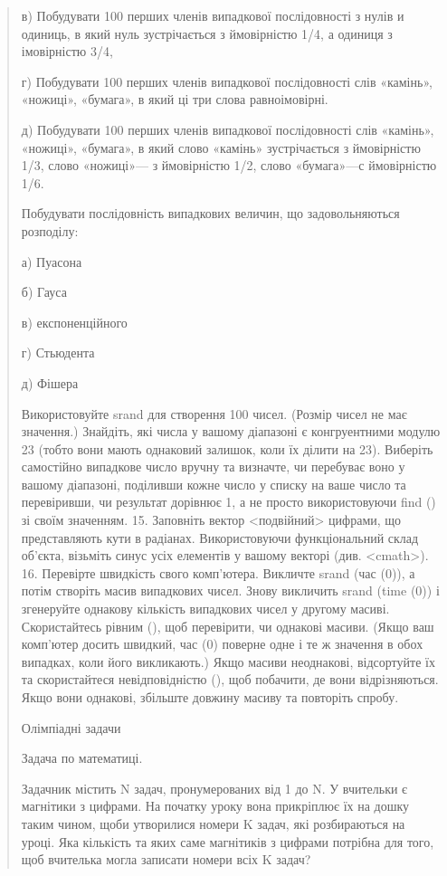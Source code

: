 \documentclass[]{article}
\begin{document}
\begin{quote}
в) Побудувати 100 перших членів випадкової послідовності з нулів и
одиниць, в який нуль зустрічається з ймовірністю 1/4, а одиниця з
імовірністю 3/4,

г) Побудувати 100 перших членів випадкової послідовності слів «камінь»,
«ножиці», «бумага», в який ці три слова равноімовірні.

д) Побудувати 100 перших членів випадкової послідовності слів «камінь»,
«ножиці», «бумага», в який слово «камінь» зустрічається з ймовірністю
1/3, слово «ножиці»--- з ймовірністю 1/2, слово «бумага»---с ймовірністю
1/6.

Побудувати послідовність випадкових величин, що задовольняються
розподілу:

а) Пуасона

б) Гауса

в) експоненційного

г) Стьюдента

д) Фішера

Використовуйте srand для створення 100 чисел. (Розмір чисел не має
значення.) Знайдіть, які числа у вашому діапазоні є конгруентними модулю
23 (тобто вони мають однаковий залишок, коли їх ділити на 23). Виберіть
самостійно випадкове число вручну та визначте, чи перебуває воно у
вашому діапазоні, поділивши кожне число у списку на ваше число та
перевіривши, чи результат дорівнює 1, а не просто використовуючи find ()
зі своїм значенням. 15. Заповніть вектор
\textless{}подвійний\textgreater{} цифрами, що представляють кути в
радіанах. Використовуючи функціональний склад об'єкта, візьміть синус
усіх елементів у вашому векторі (див. \textless{}cmath\textgreater{}).
16. Перевірте швидкість свого комп'ютера. Викличте srand (час (0)), а
потім створіть масив випадкових чисел. Знову викличить srand (time (0))
і згенеруйте однакову кількість випадкових чисел у другому масиві.
Скористайтесь рівним (), щоб перевірити, чи однакові масиви. (Якщо ваш
комп'ютер досить швидкий, час (0) поверне одне і те ж значення в обох
випадках, коли його викликають.) Якщо масиви неоднакові, відсортуйте їх
та скористайтеся невідповідністю (), щоб побачити, де вони
відрізняються. Якщо вони однакові, збільште довжину масиву та повторіть
спробу.

Олімпіадні задачи

Задача по математиці.

Задачник містить N задач, пронумерованих від 1 до N. У вчительки є
магнітики з цифрами. На початку уроку вона прикріплює їх на дошку таким
чином, щоби утворилися номери K задач, які розбираються на уроці. Яка
кількість та яких саме магнітиків з цифрами потрібна для того, щоб
вчителька могла записати номери всіх K задач?


\end{quote}
\end{document}
